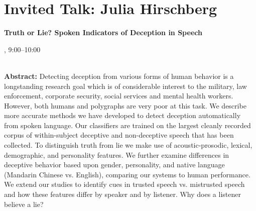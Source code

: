 \section{Invited Talk: Julia Hirschberg}


\begin{center}
\begin{Large}
{\bfseries\Large Truth or Lie? Spoken Indicators of Deception in Speech}\vspace{1em}\par
\end{Large}


\daydateyear, 9:00--10:00 \vspace{1em}\\
\PlenaryLoc \\
\vspace{1em}\par
\end{center}

\noindent
{\bfseries Abstract:} Detecting deception from various forms of human behavior is a longstanding research goal which is of considerable interest to the military, law enforcement, corporate security, social services and mental health workers. However, both humans and polygraphs are very poor at this task. We describe more accurate methods we have developed to detect deception automatically from spoken language. Our classifiers are trained on the largest cleanly recorded corpus of within-subject deceptive and non-deceptive speech that has been collected. To distinguish truth from lie we make use of acoustic-prosodic, lexical, demographic, and personality features. We further examine differences in deceptive behavior based upon gender, personality, and native language (Mandarin Chinese vs. English), comparing our systems to human performance. We extend our studies to identify cues in trusted speech vs. mistrusted speech and how these features differ by speaker and by listener. Why does a listener believe a lie? 

